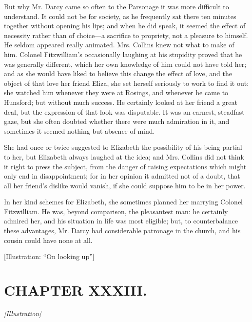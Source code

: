 \documentclass[12pt]{book}
\begin{document}
But why Mr. Darcy came so often to the Parsonage it was more difficult to understand. It could not be for society, as he frequently sat there ten minutes together without opening his lips; and when he did speak, it seemed the effect of necessity rather than of choice---a sacrifice to propriety, not a pleasure to himself. He seldom appeared really animated. Mrs. Collins knew not what to make of him. Colonel Fitzwilliam's occasionally laughing at his stupidity proved that he was generally different, which her own knowledge of him could not have told her; and as she would have liked to believe this change the effect of love, and the object of that love her friend Eliza, she set herself seriously to work to find it out: she watched him whenever they were at Rosings, and whenever he came to Hunsford; but without much success. He certainly looked at her friend a great deal, but the expression of that look was disputable. It was an earnest, steadfast gaze, but she often doubted whether there were much admiration in it, and sometimes it seemed nothing but absence of mind.

She had once or twice suggested to Elizabeth the possibility of his being partial to her, but Elizabeth always laughed at the idea; and Mrs. Collins did not think it right to press the subject, from the danger of raising expectations which might only end in disappointment; for in her opinion it admitted not of a doubt, that all her friend's dislike would vanish, if she could suppose him to be in her power.

In her kind schemes for Elizabeth, she sometimes planned her marrying Colonel Fitzwilliam. He was, beyond comparison, the pleasantest man: he certainly admired her, and his situation in life was most eligible; but, to counterbalance these advantages, Mr. Darcy had considerable patronage in the church, and his cousin could have none at all.

[Illustration: ``On looking up'']

\chapter{CHAPTER XXXIII.}

\emph{[Illustration]}
\end{document}
